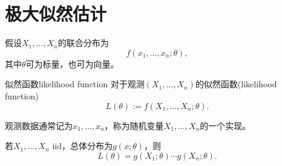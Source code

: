 \section{极大似然估计}
假设$X_1,\ldots,X_n$的联合分布为 
\[
	f(x_1,\ldots,x_n;\theta),
\]
其中$\theta$可为标量，也可为向量。
\begin{definition}{似然函数}{likelihood function}
	对于观测$(X_1,\ldots,X_n)$的似然函数(likelihood function)
	\begin{equation}
		L(\theta):=f(X_1,\ldots,X_n;\theta).
	\end{equation}
\end{definition}

\begin{remark}
	观测数据通常记为$x_1,\ldots,x_n$，称为随机变量$X_1,\ldots,X_n$的一个实现。
\end{remark}

\begin{corollary}
	若$X_1,\ldots,X_n$ iid，总体分布为$g(x;\theta)$，则
	\[
		L(\theta)=g(X_1;\theta)\cdots g(X_n;\theta).
	\]
\end{corollary}

